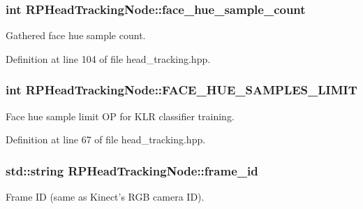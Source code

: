 \hypertarget{class_r_p_head_tracking_node_a57e407d25d6c24ebfaa9a612b63b0a07}{
\subsubsection[{face\-\_\-hue\-\_\-sample\-\_\-count}]{\setlength{\rightskip}{0pt plus 5cm}int {\bf \-R\-P\-Head\-Tracking\-Node\-::face\-\_\-hue\-\_\-sample\-\_\-count}}}\label{class_r_p_head_tracking_node_a57e407d25d6c24ebfaa9a612b63b0a07}
\-Gathered face hue sample count. 

\-Definition at line 104 of file head\-\_\-tracking.\-hpp.

\hypertarget{class_r_p_head_tracking_node_a8834e8b4fe75aa2908fd79e4021b0573}{
\subsubsection[{\-F\-A\-C\-E\-\_\-\-H\-U\-E\-\_\-\-S\-A\-M\-P\-L\-E\-S\-\_\-\-L\-I\-M\-I\-T}]{\setlength{\rightskip}{0pt plus 5cm}int {\bf \-R\-P\-Head\-Tracking\-Node\-::\-F\-A\-C\-E\-\_\-\-H\-U\-E\-\_\-\-S\-A\-M\-P\-L\-E\-S\-\_\-\-L\-I\-M\-I\-T}}}\label{class_r_p_head_tracking_node_a8834e8b4fe75aa2908fd79e4021b0573}
\-Face hue sample limit \-O\-P for \-K\-L\-R classifier training. 

\-Definition at line 67 of file head\-\_\-tracking.\-hpp.

\hypertarget{class_r_p_head_tracking_node_aa31ed34346bf9e26ecd127893d7107af}{
\subsubsection[{frame\-\_\-id}]{\setlength{\rightskip}{0pt plus 5cm}std\-::string {\bf \-R\-P\-Head\-Tracking\-Node\-::frame\-\_\-id}}}\label{class_r_p_head_tracking_node_aa31ed34346bf9e26ecd127893d7107af}
\-Frame \-I\-D (same as \-Kinect's \-R\-G\-B camera \-I\-D). 


